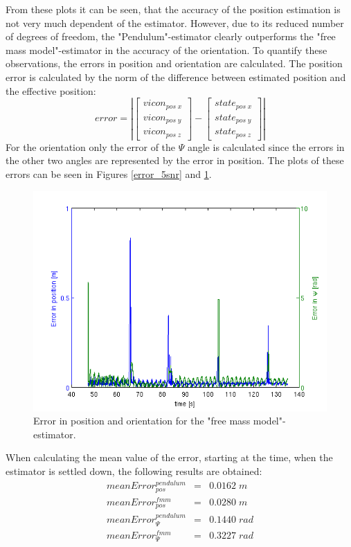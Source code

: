 From these plots it can be seen, that the accuracy of the position estimation is not very much dependent of the estimator. However, due to its reduced number of degrees of freedom, the "Pendulum"-estimator clearly outperforms the "free mass model"-estimator in the accuracy of the orientation. 
To quantify these observations, the errors in position and orientation are calculated. The position error is calculated by the norm of the difference between estimated position and the effective position: 
\begin{equation}
error= \left| \begin{bmatrix} vicon_{pos\;x} \\ vicon_{pos\;y} \\ vicon_{pos\;z} \end{bmatrix}-\begin{bmatrix}state_{pos\;x} \\ state_{pos\;y} \\ state_{pos\;z}  \end{bmatrix}\right|
\end{equation}
For the orientation only the error of the $\Psi$ angle is calculated since the errors in the other two angles are represented by the error in position. 
The plots of these errors can be seen in Figures \ref{error_5snr} and \ref{error_5snr_fmm}. 
\begin{figure}[hb]
\centering
\includegraphics[width=1\textwidth]{pictures/2_2_fmm_SNR5_errors_GPS.png}
\caption{Error in position and orientation for the "free mass model"-estimator.}
\label{error_5snr_fmm}
\end{figure}
When calculating the mean value of the error, starting at the time, when the estimator is settled down, the following results are obtained:
\begin{eqnarray}
meanError_{pos}^{pendulum}&=&0.0162\;m \\ meanError_{pos}^{fmm}&=&0.0280\;m \\ meanError_{\Psi}^{pendulum}&=& 0.1440\;rad\\ meanError_{\Psi}^{fmm}&=& 0.3227 \;rad
\end{eqnarray} 



